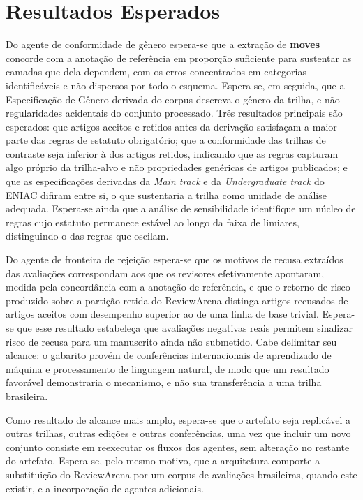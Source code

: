 


\chapter{Resultados Esperados}\label{chap:resultados_esperados}


Do agente de conformidade de gênero espera-se que a extração de \textbf{moves} concorde com a anotação de referência em proporção suficiente para sustentar as camadas que dela dependem, com os erros concentrados em categorias identificáveis e não dispersos por todo o esquema. Espera-se, em seguida, que a Especificação de Gênero derivada do corpus descreva o gênero da trilha, e não regularidades acidentais do conjunto processado. Três resultados principais são esperados: que artigos aceitos e retidos antes da derivação satisfaçam a maior parte das regras de estatuto obrigatório; que a conformidade das trilhas de contraste seja inferior à dos artigos retidos, indicando que as regras capturam algo próprio da trilha-alvo e não propriedades genéricas de artigos publicados; e que as especificações derivadas da \textit{Main track} e da \textit{Undergraduate track} do ENIAC difiram entre si, o que sustentaria a trilha como unidade de análise adequada. Espera-se ainda que a análise de sensibilidade identifique um núcleo de regras cujo estatuto permanece estável ao longo da faixa de limiares, distinguindo-o das regras que oscilam.

Do agente de fronteira de rejeição espera-se que os motivos de recusa extraídos das avaliações correspondam aos que os revisores efetivamente apontaram, medida pela concordância com a anotação de referência, e que o retorno de risco produzido sobre a partição retida do ReviewArena distinga artigos recusados de artigos aceitos com desempenho superior ao de uma linha de base trivial. Espera-se que esse resultado estabeleça que avaliações negativas reais permitem sinalizar risco de recusa para um manuscrito ainda não submetido. Cabe delimitar seu alcance: o gabarito provém de conferências internacionais de aprendizado de máquina e processamento de linguagem natural, de modo que um resultado favorável demonstraria o mecanismo, e não sua transferência a uma trilha brasileira.

Como resultado de alcance mais amplo, espera-se que o artefato seja replicável a outras trilhas, outras edições e outras conferências, uma vez que incluir um novo conjunto consiste em reexecutar os fluxos dos agentes, sem alteração no restante do artefato. Espera-se, pelo mesmo motivo, que a arquitetura comporte a substituição do ReviewArena por um corpus de avaliações brasileiras, quando este existir, e a incorporação de agentes adicionais.

